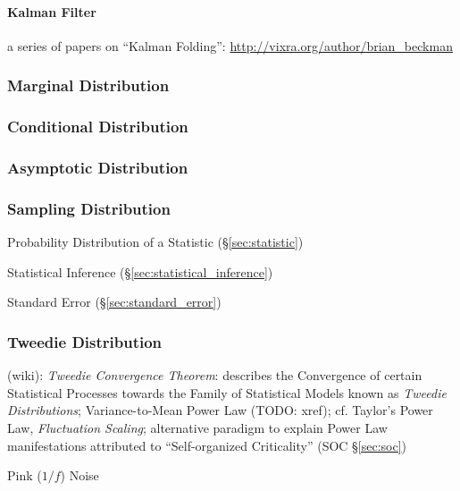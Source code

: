 \paragraph{Kalman Filter}\label{sec:kalman_filter}\hfill

a series of papers on ``Kalman Folding'':
\url{http://vixra.org/author/brian_beckman}



\subsubsection{Marginal Distribution}\label{sec:marginal_distribution}

\subsubsection{Conditional Distribution}
\label{sec:conditional_distribution}

\subsubsection{Asymptotic Distribution}
\label{sec:asymptotic_distribution}

\subsubsection{Sampling Distribution}\label{sec:sampling_distribution}

Probability Distribution of a Statistic (\S\ref{sec:statistic})

Statistical Inference (\S\ref{sec:statistical_inference})

Standard Error (\S\ref{sec:standard_error})



\subsubsection{Tweedie Distribution}\label{sec:tweedie_distribution}

(wiki): \emph{Tweedie Convergence Theorem}: describes the Convergence of certain
Statistical Processes towards the Family of Statistical Models known as
\emph{Tweedie Distributions}; Variance-to-Mean Power Law (TODO: xref); cf.
Taylor's Power Law, \emph{Fluctuation Scaling}; alternative paradigm to explain
Power Law manifestations attributed to ``Self-organized Criticality''
(SOC \S\ref{sec:soc})

Pink ($1/f$) Noise


